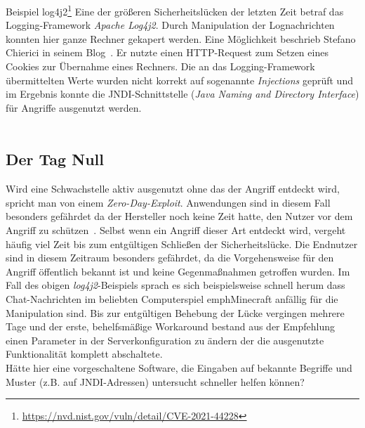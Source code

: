 \textcolor{bhtGray}{ Beispiel log4j2\footnote{\url{https://nvd.nist.gov/vuln/detail/CVE-2021-44228}}} Eine der größeren Sicherheitslücken der letzten Zeit betraf das Logging-Framework \emph{Apache Log4j2}. Durch Manipulation der Lognachrichten konnten hier ganze Rechner gekapert werden. Eine Möglichkeit beschrieb Stefano Chierici in seinem Blog~\cite{chierici2021}. Er nutzte einen HTTP-Request zum Setzen eines Cookies zur Übernahme eines Rechners. Die an das Logging-Framework übermittelten Werte wurden nicht korrekt auf sogenannte \emph{Injections} geprüft und im Ergebnis konnte die JNDI-Schnittstelle (\emph{Java Naming and Directory Interface}) für Angriffe ausgenutzt werden. \\\\


\subsection{Der Tag Null}

Wird eine Schwachstelle aktiv ausgenutzt ohne das der Angriff entdeckt wird, spricht man von einem \glqq\emph{Zero-Day-Exploit}\grqq. Anwendungen sind in diesem Fall besonders gefährdet da der Hersteller noch keine Zeit hatte, den Nutzer vor dem Angriff zu schützen~\cite{bsi0day}. Selbst wenn ein Angriff dieser Art entdeckt wird, vergeht häufig viel Zeit bis zum entgültigen Schließen der Sicherheitslücke. Die Endnutzer sind in diesem Zeitraum besonders gefährdet, da die Vorgehensweise für den Angriff öffentlich bekannt ist und keine Gegenmaßnahmen getroffen wurden. Im Fall des obigen \emph{log4j2}-Beispiels sprach es sich beispielsweise schnell herum dass Chat-Nachrichten im beliebten Computerspiel emph{Minecraft} anfällig für die Manipulation sind. Bis zur entgültigen Behebung der Lücke vergingen mehrere Tage und der erste, behelfsmäßige Workaround bestand aus der Empfehlung einen Parameter in der Serverkonfiguration zu ändern der die ausgenutzte Funktionalität komplett abschaltete.\\ Hätte hier eine vorgeschaltene Software, die Eingaben auf bekannte Begriffe und Muster (z.B. auf JNDI-Adressen) untersucht schneller helfen können?

